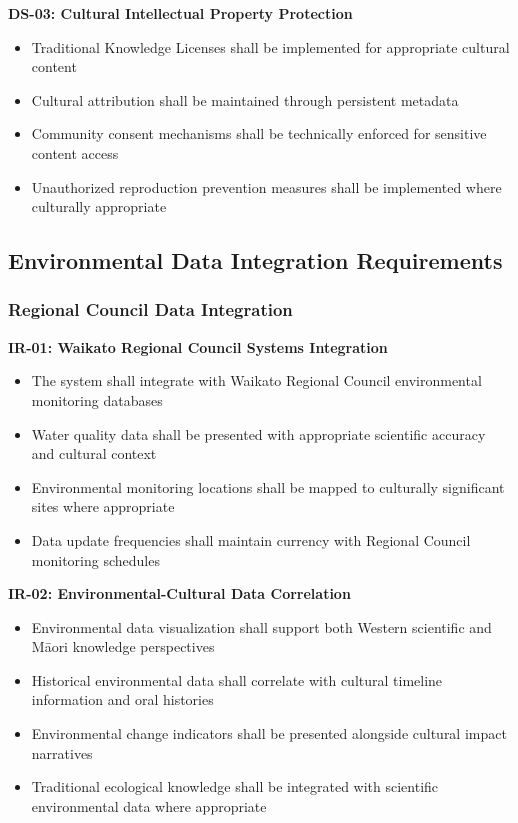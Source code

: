 \textbf{DS-03: Cultural Intellectual Property Protection}
\begin{itemize}
    \item Traditional Knowledge Licenses shall be implemented for appropriate cultural content
    \item Cultural attribution shall be maintained through persistent metadata
    \item Community consent mechanisms shall be technically enforced for sensitive content access
    \item Unauthorized reproduction prevention measures shall be implemented where culturally appropriate
\end{itemize}

\subsection{Environmental Data Integration Requirements}
\label{subsec:environmental_integration}

\subsubsection{Regional Council Data Integration}
\label{subsubsec:regional_data}

\textbf{IR-01: Waikato Regional Council Systems Integration}
\begin{itemize}
    \item The system shall integrate with Waikato Regional Council environmental monitoring databases
    \item Water quality data shall be presented with appropriate scientific accuracy and cultural context
    \item Environmental monitoring locations shall be mapped to culturally significant sites where appropriate
    \item Data update frequencies shall maintain currency with Regional Council monitoring schedules
\end{itemize}

\textbf{IR-02: Environmental-Cultural Data Correlation}
\begin{itemize}
    \item Environmental data visualization shall support both Western scientific and M\=aori knowledge perspectives
    \item Historical environmental data shall correlate with cultural timeline information and oral histories
    \item Environmental change indicators shall be presented alongside cultural impact narratives
    \item Traditional ecological knowledge shall be integrated with scientific environmental data where appropriate
\end{itemize}

